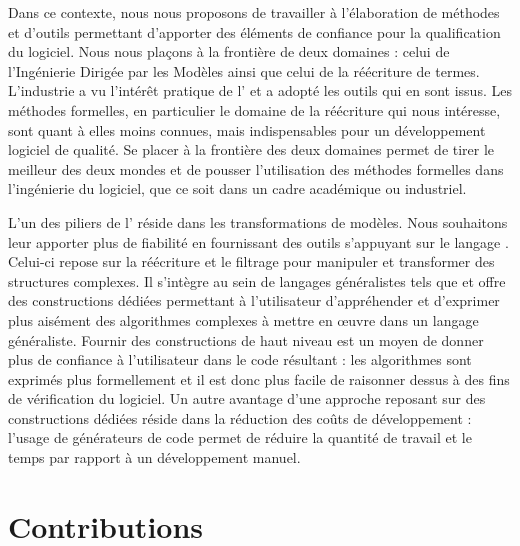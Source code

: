 Dans ce contexte, nous nous proposons de travailler à l'élaboration de méthodes
et d'outils permettant d'apporter des éléments de confiance pour la
qualification du logiciel.
Nous nous plaçons à la frontière de deux domaines : celui de l'Ingénierie
Dirigée par les Modèles ainsi que celui de la réécriture de termes. L'industrie
a vu l'intérêt pratique de l'{\idm} et a adopté les outils qui en sont issus.
Les méthodes formelles, en particulier le domaine de la réécriture qui nous
intéresse, sont quant à elles moins connues, mais indispensables pour un
développement logiciel de qualité. Se placer à la frontière des deux domaines
permet de tirer le meilleur des deux mondes et de pousser l'utilisation des
méthodes formelles dans l'ingénierie du logiciel, que ce soit dans un cadre
académique ou industriel. 

L'un des piliers de l'{\idm} réside dans les transformations de modèles. Nous
souhaitons leur apporter plus de fiabilité en fournissant des outils s'appuyant
sur le langage {\tom}. Celui-ci repose sur la réécriture et le filtrage pour
manipuler et transformer des structures complexes. Il s'intègre au sein de
langages généralistes tels que {\java} et offre des constructions dédiées
permettant à l'utilisateur d'appréhender et d'exprimer plus aisément des
algorithmes complexes à mettre en œuvre dans un langage généraliste. Fournir
des constructions de haut niveau est un moyen de donner plus de confiance à
l'utilisateur dans le code résultant : les algorithmes sont exprimés plus
formellement et il est donc plus facile de raisonner dessus à des fins de
vérification du logiciel. Un autre avantage d'une approche reposant sur des
constructions dédiées réside dans la réduction des coûts de développement :
l'usage de générateurs de code permet de réduire la quantité de travail et le
temps par rapport à un développement manuel. 


\section*{Contributions}

